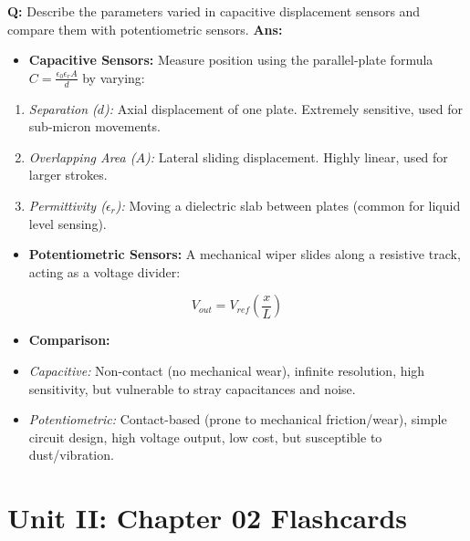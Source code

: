 \documentclass[10pt,a4paper,twocolumn]{article}
\begin{document}
\begin{tcolorbox}[
  colback=white,
  colframe=UnitColorOne,
  colbacktitle=gray!10!white,
  coltitle=black,
  fonttitle=\bfseries\sffamily\small,
  title={Unit I $\bullet$ Card 18: Capacitive \& Potentiometric Displacement Sensors (Q1.10)},
  boxrule=1.2pt,
  arc=2mm,
  outer arc=2mm,
  boxsep=1.5mm,
  top=1mm,
  bottom=1mm,
  left=1.5mm,
  right=1.5mm,
  before skip=2.5mm,
  after skip=2.5mm
]
\textbf{Q:} Describe the parameters varied in capacitive displacement sensors and compare them with potentiometric sensors.
\tcbline
\textbf{Ans:} \begin{itemize}
  \item   \textbf{Capacitive Sensors:} Measure position using the parallel-plate formula $C = \frac{\epsilon_0 \epsilon_r A}{d}$ by varying:
\end{itemize}
\begin{enumerate}
  \item \textit{Separation ($d$):} Axial displacement of one plate. Extremely sensitive, used for sub-micron movements.
  \item \textit{Overlapping Area ($A$):} Lateral sliding displacement. Highly linear, used for larger strokes.
  \item \textit{Permittivity ($\epsilon_r$):} Moving a dielectric slab between plates (common for liquid level sensing).
\end{enumerate}
\begin{itemize}
  \item   \textbf{Potentiometric Sensors:} A mechanical wiper slides along a resistive track, acting as a voltage divider:
\end{itemize}
        \[ V_{out} = V_{ref} \left( \frac{x}{L} \right) \]
\begin{itemize}
  \item   \textbf{Comparison:}
  \item   \textit{Capacitive:} Non-contact (no mechanical wear), infinite resolution, high sensitivity, but vulnerable to stray capacitances and noise.
  \item   \textit{Potentiometric:} Contact-based (prone to mechanical friction/wear), simple circuit design, high voltage output, low cost, but susceptible to dust/vibration.
\end{itemize}
\end{tcolorbox}

\section*{Unit II: Chapter 02 Flashcards}
\end{document}
